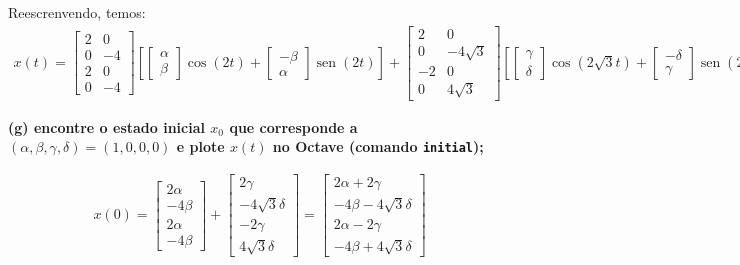 \documentclass[11pt]{article}
\DeclareMathOperator{\sen}{sen}
\begin{document}
Reescrenvendo, temos:
\begin{align*}
  x(t) =
  \begin{bmatrix}
    2 & 0\\
    0 & -4\\
    2 & 0\\
    0 & -4
  \end{bmatrix}
  \left[
    \begin{bmatrix}
      \alpha\\
      \beta
    \end{bmatrix}
    \cos(2t) +
    \begin{bmatrix}
      -\beta\\
      \alpha
    \end{bmatrix}
    \sen(2t)
  \right] + 
  \begin{bmatrix}
    2 & 0\\
    0 & -4\sqrt{3}\\
    -2 & 0\\
    0 & 4\sqrt{3}
  \end{bmatrix}
  \left[
    \begin{bmatrix}
      \gamma\\
      \delta
    \end{bmatrix}
    \cos(2\sqrt{3}t) +
    \begin{bmatrix}
      -\delta\\
      \gamma
    \end{bmatrix}
    \sen(2\sqrt{3}t)
  \right]
\end{align*}

\textbf{(g) encontre o estado inicial $x_0$ que corresponde a $(\alpha, \beta, \gamma, \delta) = (1, 0, 0, 0)$ e plote $x(t)$ no Octave (comando \texttt{initial});}

\begin{align*}
  x(0) =
  \begin{bmatrix}
    2\alpha\\
    -4\beta\\
    2\alpha\\
    -4\beta
  \end{bmatrix}
  +
  \begin{bmatrix}
    2\gamma\\
    -4\sqrt{3}\delta\\
    -2\gamma\\
    4\sqrt{3}\delta
  \end{bmatrix}
  =
  \begin{bmatrix}
    2\alpha + 2\gamma\\
    -4\beta - 4\sqrt{3}\delta\\
    2\alpha - 2\gamma\\
    -4\beta + 4\sqrt{3}\delta
  \end{bmatrix}
\end{align*}
\end{document}
